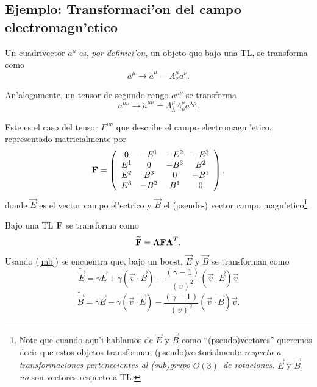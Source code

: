 \subsection{Ejemplo: Transformaci'on del campo electromagn'etico}

Un cuadrivector $a^{\mu }$ es, {\em por definici'on}, un objeto que bajo
una TL, se transforma como 
\begin{equation}
a^{\mu }\rightarrow \widetilde{a}^{\mu }=\Lambda _{\nu }^{\mu }a^{\nu }. 
\end{equation}

An'alogamente, un tensor de segundo rango $a^{\mu \nu }$ se transforma 
\begin{equation}
a^{\mu \nu }\rightarrow \widetilde{a}^{\mu \nu }=\Lambda _{\lambda }^{\mu
}\Lambda _{\rho }^{\nu }a^{\lambda \rho }.  \label{tf}
\end{equation}

Este es el caso del tensor $F^{\mu \nu }$ que describe el campo electromagn%
'etico, representado matricialmente por 
\begin{equation}
{\bf F}=\left( 
\begin{array}{cccc}
0 & -E^1 & -E^2 & -E^3 \\ 
E^1 & 0 & -B^3 & B^2 \\ 
E^2 & B^3 & 0 & -B^1 \\ 
E^3 & -B^2 & B^1 & 0
\end{array}
\right) ,
\end{equation}
donde $\vec{E}$ es el vector campo el'ectrico y $%
\vec{B}$ el (pseudo-) vector campo magn'etico\footnote{%
Note que cuando aqu{'i} hablamos de $\vec{E}$ y $%
\vec{B}$ como ``(pseudo)vectores'' queremos decir que estos
objetos transforman (pseudo)vectorialmente {\em respecto a transformaciones
pertenecientes al (sub)grupo }$O(3)${\em \ de rotaciones}. $\vec{E%
}$ y $\vec{B}$ {\em no} son vectores respecto a TL.}

Bajo una TL ${\bf F}$ se transforma como 
\begin{equation}
\widetilde{{\bf F}}={\bf \Lambda F\Lambda }^{T}. 
\end{equation}

Usando (\ref{mb}) se encuentra que, bajo un boost, $\vec{E}$ y $%
\vec{B}$ se transforman como 
\begin{equation}
\widetilde{\vec{E}}=\gamma \vec{E}+\gamma \left( 
\vec{v}\cdot \vec{B}\right) -\frac{(\gamma -1)}{\left(
v\right) ^2}\left( \vec{v}\cdot \vec{E}\right) 
\vec{v}
\end{equation}
\begin{equation}
\widetilde{\vec{B}}=\gamma \vec{B}-\gamma \left( 
\vec{v}\cdot \vec{E}\right) -\frac{(\gamma -1)}{\left(
v\right) ^2}\left( \vec{v}\cdot \vec{B}\right) 
\vec{v}.
\end{equation}

